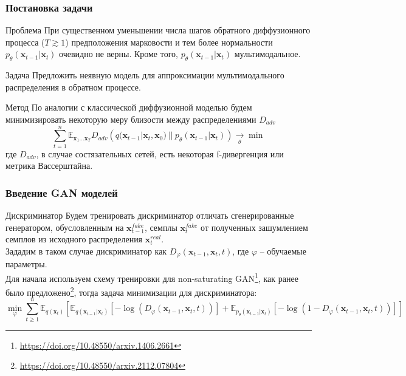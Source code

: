 \documentclass[8pt]{beamer}
\begin{document}
\begin{frame}
\end{frame}

\begin{frame}
	\frametitle{Постановка задачи}
		\begin{block}{Проблема}
			При существенном уменьшении числа шагов обратного диффузионного процесса ($T\gtrsim 1$) предположения марковости и тем более нормальности $p_\theta(\textbf{x}_{t-1}|\textbf{x}_t)$ очевидно не верны. Кроме того, $p_\theta(\textbf{x}_{t-1}|\textbf{x}_t)$ мультимодальное.
		\end{block}
	
		\begin{block}{Задача}
			Предложить неявную модель для аппроксимации мультимодального распределения в обратном процессе. 
		\end{block}
	
	\begin{block}{Метод}
			По аналогии с классической диффузионной моделью будем минимизировать некоторую меру близости между распределениями $D_{adv}$
			 \begin{equation*}
			\sum\limits_{t=1}^n \mathbb{E}_{\textbf{x}_1\dots \textbf{x}_T} D_{adv}\left(q(\textbf{x}_{t-1}|\textbf{x}_t, \textbf{x}_0)~||~p_\theta(\textbf{x}_{t-1}|\textbf{x}_t)  \right) \xrightarrow[\theta]{}\min
		\end{equation*}
			где $D_{adv}$, в случае состязательных сетей, есть некоторая f-дивергенция или метрика Вассерштайна.
		\end{block}

\end{frame}


\begin{frame}
	\frametitle{Введение GAN моделей}
	\begin{block}{Дискриминатор}
		Будем тренировать дискриминатор отличать сгенерированные генератором, обусловленным на $\textbf{x}_{t-1}^{fake}$, семплы $\textbf{x}_t^{fake}$ от полученных зашумлением семплов из исходного распределения $\textbf{x}_t^{real}$.\\
		Зададим в таком случае дискриминатор как $D_\varphi(\textbf{x}_{t-1}, \textbf{x}_t, t)$, где $\varphi$ -- обучаемые параметры.\\
		Для начала используем схему тренировки для non-saturating GAN\footnote{\url{https://doi.org/10.48550/arxiv.1406.2661}}, как ранее было предложено\footnote{\url{https://doi.org/10.48550/arxiv.2112.07804}}, тогда задача минимизации для дискриминатора:
		$$  \min\limits_\varphi\sum\limits_{t\geqslant 1}^n \mathbb{E}_{q(\textbf{x}_t)}[\mathbb{E}_{q(\textbf{x}_{t-1}|\textbf{x}_t)}[-\log{ (D_\varphi(\textbf{x}_{t-1}, \textbf{x}_t, t) ) }] + \mathbb{E}_{p_\theta(\textbf{x}_{t-1}|\textbf{x}_t)}[-\log{  (1 - D_\varphi(\textbf{x}_{t-1}, \textbf{x}_t, t))  }]]$$
		\end{block}
\end{frame}	
	
\end{document}
